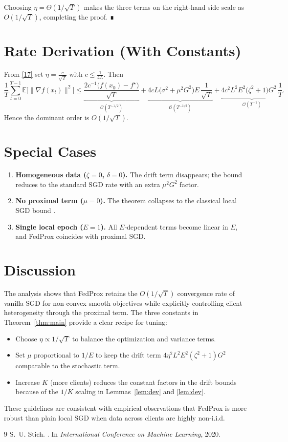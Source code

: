 \documentclass[11pt]{article}
\begin{document}
Choosing $\eta=\Theta(1/\sqrt{T})$ makes the three terms on the right‑hand
side scale as $O(1/\sqrt{T})$, completing the proof. ∎

\section*{Rate Derivation (With Constants)}
From \eqref{17} set $\eta = \frac{c}{\sqrt{T}}$ with
$c\le \frac{1}{4L}$.
Then
\[
\frac{1}{T}\sum_{t=0}^{T-1}
   \mathbb{E}\!\big[\|\nabla f(x_t)\|^{2}\big]
\le
\underbrace{\frac{2c^{-1}\big(f(x_0)-f^{\star}\big)}{\sqrt{T}}}_{\mathcal{O}(T^{-1/2})}
+
\underbrace{4cL\big(\sigma^{2}+ \mu^{2}G^{2}\big)E\,\frac{1}{\sqrt{T}}}_{\mathcal{O}(T^{-1/2})}
+
\underbrace{4c^{2}L^{2}E^{2}\big(\zeta^{2}+1\big)G^{2}\,\frac{1}{T}}_{\mathcal{O}(T^{-1})}.
\]
Hence the dominant order is $O(1/\sqrt{T})$.

\section*{Special Cases}
\begin{enumerate}[label=\alph*.]
\item \textbf{Homogeneous data ($\zeta=0$, $\delta=0$).}  
The drift term disappears; the bound reduces to the standard SGD
rate with an extra $\mu^{2}G^{2}$ factor.
\item \textbf{No proximal term ($\mu=0$).}  
The theorem collapses to the classical local SGD bound
\cite{stich2019local}.
\item \textbf{Single local epoch ($E=1$).}  
All $E$‑dependent terms become linear in $E$, and FedProx coincides with
proximal SGD.
\end{enumerate}

\section*{Discussion}
The analysis shows that FedProx retains the $O(1/\sqrt{T})$ convergence
rate of vanilla SGD for non‑convex smooth objectives while explicitly
controlling client heterogeneity through the proximal term.  The three
constants in Theorem~\ref{thm:main} provide a clear recipe for tuning:
\begin{itemize}
  \item Choose $\eta\propto 1/\sqrt{T}$ to balance the optimization and
  variance terms.
  \item Set $\mu$ proportional to $1/E$ to keep the drift term
  $4\eta^{2}L^{2}E^{2}(\zeta^{2}+1)G^{2}$ comparable to the stochastic
  term.
  \item Increase $K$ (more clients) reduces the constant factors in the
  drift bounds because of the $1/K$ scaling in Lemmas~\ref{lem:dev}
  and \ref{lem:dev}.
\end{itemize}
These guidelines are consistent with empirical observations that FedProx
is more robust than plain local SGD when data across clients are highly
non‑i.i.d.

\begin{thebibliography}{9}
S.~U. Stich.
.
\newblock In \emph{International Conference on Machine Learning}, 2020.
\end{thebibliography}
\end{document}
